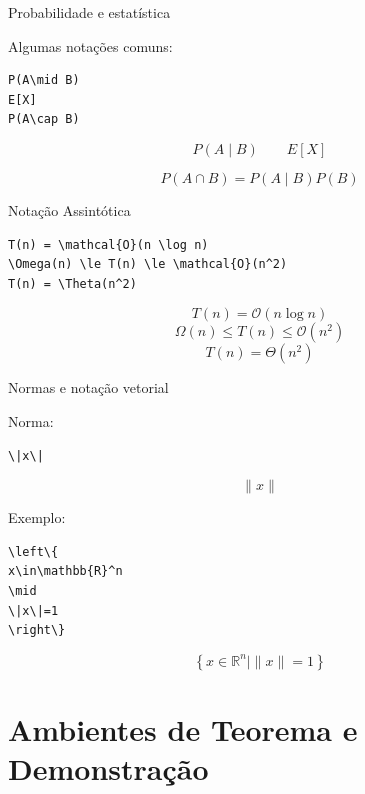 \documentclass[aspectratio=169,xcolor=dvipsnames]{beamer}
\begin{document}
\begin{frame}[fragile]{Probabilidade e estatística}

    Algumas notações comuns:

\begin{lstlisting}
P(A\mid B)
E[X]
P(A\cap B)
\end{lstlisting}

    \[
        P(A\mid B)
        \qquad
        E[X]
    \]

    \[
        P(A\cap B)
        =
        P(A\mid B)P(B)
    \]

\end{frame}

\begin{frame}[fragile]{Notação Assintótica}

\begin{lstlisting}
T(n) = \mathcal{O}(n \log n)
\Omega(n) \le T(n) \le \mathcal{O}(n^2)
T(n) = \Theta(n^2)
\end{lstlisting}

    \[
    T(n) = \mathcal{O}(n \log n)
    \]
    \[
    \Omega(n) \le T(n) \le \mathcal{O}(n^2)
    \]
    \[
    T(n) = \Theta(n^2)
    \]

\end{frame}

\begin{frame}[fragile]{Normas e notação vetorial}

    Norma:

\begin{lstlisting}
\|x\|
\end{lstlisting}

    \[
        \|x\|
    \]

    Exemplo:

\begin{lstlisting}
\left\{
x\in\mathbb{R}^n
\mid
\|x\|=1
\right\}
\end{lstlisting}

    \[
        \left\{
            x\in\mathbb{R}^n
            \mid
            \|x\|=1
        \right\}
    \]

\end{frame}


\section{Ambientes de Teorema e Demonstração}
\end{document}

